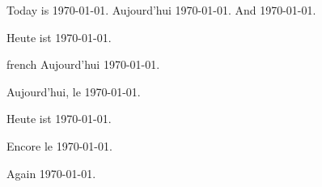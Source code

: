 \documentclass{article}
\begin{document}
Today is \today.
\foreignlanguage{french}{Aujourd'hui \today.} And \today.

\begin{otherlanguage}{ngerman}
Heute ist \today.
\end{otherlanguage}

\begin{otherlanguage*}{french}
Aujourd'hui \today.
\end{otherlanguage*}

Aujourd'hui, le \today.
\begin{otherlanguage}{ngerman}
Heute ist \today.
\end{otherlanguage}
Encore le \today.

Again \today.
\end{document}
